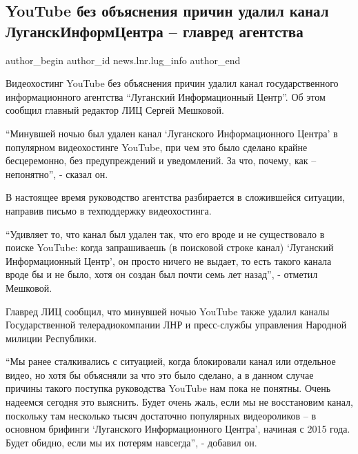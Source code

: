  
 
 
 
 
 
\subsection{YouTube без объяснения причин удалил канал ЛуганскИнформЦентра – главред агентства}
\label{sec:04_02_2022.stz.news.lnr.lug_info.1.youtube_lnr_cenzura}
 
\ifcmt
 author_begin
   author_id news.lnr.lug_info
 author_end
\fi

Видеохостинг YouTube без объяснения причин удалил канал государственного
информационного агентства \enquote{Луганский Информационный Центр}. Об этом сообщил
главный редактор ЛИЦ Сергей Мешковой. 


\enquote{Минувшей ночью был удален канал \enquote{Луганского Информационного
Центра} в популярном видеохостинге YouTube, при чем это было сделано крайне
бесцеремонно, без предупреждений и уведомлений. За что, почему, как –
непонятно}, - сказал он.

В настоящее время руководство агентства разбирается в сложившейся ситуации,
направив письмо в техподдержку видеохостинга.

\enquote{Удивляет то, что канал был удален так, что его вроде и не существовало в
поиске YouTube: когда запрашиваешь (в поисковой строке канал) \enquote{Луганский
Информационный Центр}, он просто ничего не выдает, то есть такого канала вроде
бы и не было, хотя он создан был почти семь лет назад}, - отметил Мешковой. 

Главред ЛИЦ сообщил, что минувшей ночью YouTube также удалил каналы
Государственной телерадиокомпании ЛНР и пресс-службы управления Народной
милиции Республики. 

\enquote{Мы ранее сталкивались с ситуацией, когда блокировали канал или отдельное
видео, но хотя бы объясняли за что это было сделано, а в данном случае причины
такого поступка руководства YouTube нам пока не понятны. Очень надеемся сегодня
это выяснить. Будет очень жаль, если мы не восстановим канал, поскольку там
несколько тысяч достаточно популярных видеороликов – в основном брифинги
\enquote{Луганского Информационного Центра}, начиная с 2015 года. Будет обидно, если мы
их потерям навсегда}, - добавил он.
